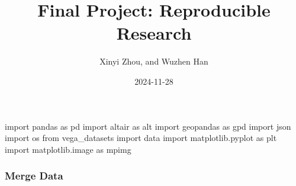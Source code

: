 \documentclass[
  letterpaper,
  DIV=11,
  numbers=noendperiod]{scrartcl}
\title{Final Project: Reproducible Research}
\author{Xinyi Zhou, and Wuzhen Han}
\date{2024-11-28}
\newenvironment{Shaded}{\begin{snugshade}}{\end{snugshade}}
\newcommand{\ImportTok}[1]{\textcolor[rgb]{0.00,0.46,0.62}{#1}}
\newcommand{\NormalTok}[1]{\textcolor[rgb]{0.00,0.23,0.31}{#1}}
\begin{document}
\maketitle



\begin{Shaded}
\begin{Highlighting}[]
\ImportTok{import}\NormalTok{ pandas }\ImportTok{as}\NormalTok{ pd}
\ImportTok{import}\NormalTok{ altair }\ImportTok{as}\NormalTok{ alt}
\ImportTok{import}\NormalTok{ geopandas }\ImportTok{as}\NormalTok{ gpd}
\ImportTok{import}\NormalTok{ json}
\ImportTok{import}\NormalTok{ os}
\ImportTok{from}\NormalTok{ vega\_datasets }\ImportTok{import}\NormalTok{ data}
\ImportTok{import}\NormalTok{ matplotlib.pyplot }\ImportTok{as}\NormalTok{ plt}
\ImportTok{import}\NormalTok{ matplotlib.image }\ImportTok{as}\NormalTok{ mpimg}
\end{Highlighting}
\end{Shaded}

\subsubsection{Merge Data}\label{merge-data}
\end{document}
